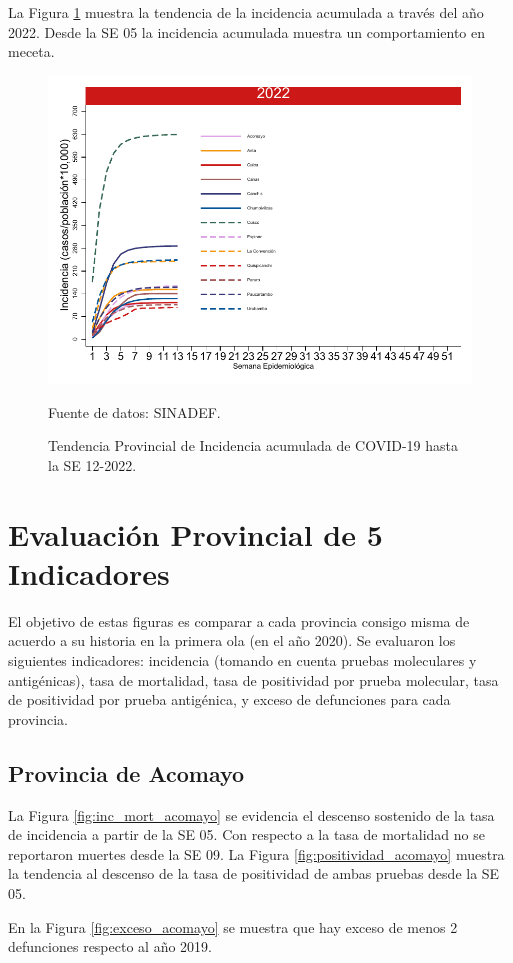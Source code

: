 \documentclass[12pt,a4paper,openany]{book}
\begin{document}
La Figura \ref{fig:incidencia_provincial} muestra la tendencia de la incidencia acumulada a través del año 2022. Desde la SE 05 la incidencia acumulada muestra un comportamiento en meceta. 
%
\begin{figure}[h]
	\caption{Tendencia Provincial de Incidencia acumulada de COVID-19 hasta la SE 12-2022. }\label{fig:incidencia_provincial}
	\begin{center}
		\includegraphics[width=0.60\linewidth]{../figuras/incidencia_provincial_acumulada_2022.pdf}
	\end{center}
	{\footnotesize {Fuente de datos: SINADEF.}}
\end{figure}

\clearpage
	
\section*{Evaluación Provincial de 5 Indicadores}
		\noindent El objetivo de estas figuras es comparar a cada provincia consigo misma de acuerdo a su historia  en la primera ola (en el año 2020). Se evaluaron los siguientes indicadores: incidencia (tomando en cuenta pruebas moleculares y antigénicas), tasa de mortalidad, tasa de positividad por prueba molecular, tasa de positividad por prueba antigénica, y exceso de defunciones para cada provincia.
		
		\subsection*{Provincia de Acomayo}
		\noindent La Figura \ref{fig:inc_mort_acomayo} se evidencia el descenso sostenido de la tasa de incidencia a partir de la SE 05. Con respecto a la tasa de mortalidad no se reportaron muertes desde la SE 09.
		\noindent La Figura \ref{fig:positividad_acomayo} muestra la tendencia al descenso de la tasa de positividad de ambas pruebas desde la SE 05. 
		
		 En la Figura \ref{fig:exceso_acomayo} se muestra que hay exceso de menos 2 defunciones respecto al año 2019.
		
\end{document}
